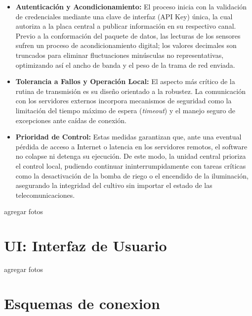 \begin{itemize}
    \item \textbf{Autenticación y Acondicionamiento:} El proceso inicia con la validación de credenciales mediante una clave de interfaz (API Key) única, la cual autoriza a la placa central a publicar información en su respectivo canal. Previo a la conformación del paquete de datos, las lecturas de los sensores sufren un proceso de acondicionamiento digital; los valores decimales son truncados para eliminar fluctuaciones minúsculas no representativas, optimizando así el ancho de banda y el peso de la trama de red enviada.
    
    \item \textbf{Tolerancia a Fallos y Operación Local:} El aspecto más crítico de la rutina de transmisión es su diseño orientado a la robustez. La comunicación con los servidores externos incorpora mecanismos de seguridad como la limitación del tiempo máximo de espera (\textit{timeout}) y el manejo seguro de excepciones ante caídas de conexión. 
    
    \item \textbf{Prioridad de Control:} Estas medidas garantizan que, ante una eventual pérdida de acceso a Internet o latencia en los servidores remotos, el software no colapse ni detenga su ejecución. De este modo, la unidad central prioriza el control local, pudiendo continuar ininterrumpidamente con tareas críticas como la desactivación de la bomba de riego o el encendido de la iluminación, asegurando la integridad del cultivo sin importar el estado de las telecomunicaciones.
\end{itemize}

agregar fotos

\section{UI: Interfaz de Usuario}

agregar fotos

\section{Esquemas de conexion}


